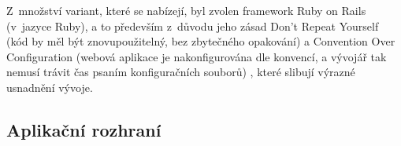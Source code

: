 \documentclass[twoside]{ctuthesis}
\begin{document}
\begin{enumerate}[label=\textbf{O\arabic*.}]
Z~množství variant, které se nabízejí, byl zvolen framework Ruby on Rails (v~jazyce Ruby), a to především z~důvodu jeho zásad Don't Repeat Yourself (kód by měl být znovupoužitelný, bez zbytečného opakování) a Convention Over Configuration (webová aplikace je nakonfigurována dle konvencí, a vývojář tak nemusí trávit čas psaním konfiguračních souborů) \cite{rails2020}, které slibují výrazné usnadnění vývoje.


%
%
%
%
%





\subsection{Aplikační rozhraní}


\end{enumerate}
\end{document}
